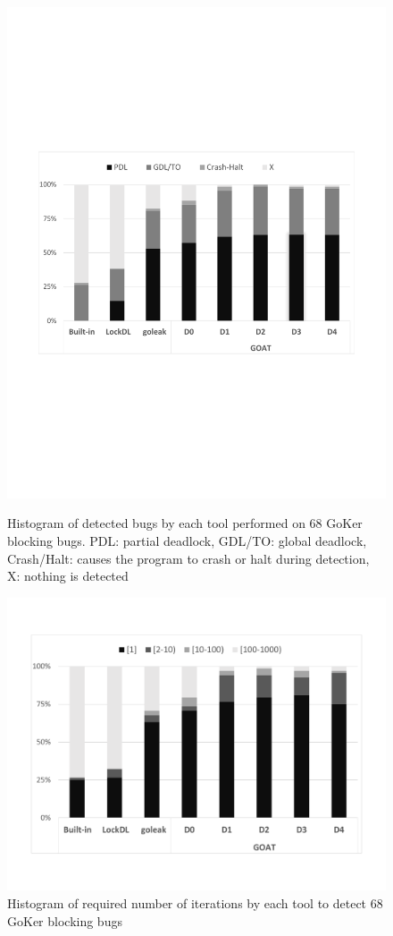 \begin{figure}[t]
\begin{minipage}{.48\textwidth}
\centering
  \includegraphics[width=.95\linewidth]{goat/figs/P4_detections.pdf}
  \caption{Histogram of detected bugs by each tool performed on 68 GoKer blocking bugs. PDL: partial deadlock, GDL/TO: global deadlock, Crash/Halt: causes the program to crash or halt during detection, X: nothing is detected }
  \label{fig:detection}
\end{minipage}
\begin{minipage}{.48\textwidth}
\centering
  \includegraphics[width=.95\linewidth]{goat/figs/P4_runs.pdf}
  \caption{Histogram of required number of iterations by each tool to detect 68 GoKer blocking bugs}
  \label{fig:runs}
\end{minipage}
\end{figure}

